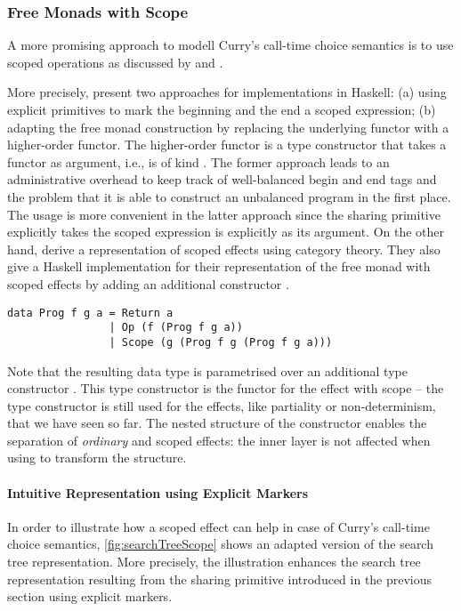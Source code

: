 \subsubsection{Free Monads with Scope}

A more promising approach to modell Curry's call-time choice semantics is to use scoped operations as discussed by \citet{wu2014effect} and \citet{pirog2018syntax}.

More precisely, \citeauthor{wu2014effect} present two approaches for implementations in Haskell: (a) using explicit primitives to mark the beginning and the end a scoped expression; (b) adapting the free monad construction by replacing the underlying functor with a higher-order functor.
The higher-order functor is a type constructor that takes a functor as argument, i.e., is of kind \hinl{(* -> *) -> * -> *}.
The former approach leads to an administrative overhead to keep track of well-balanced begin and end tags and the problem that it is able to construct an unbalanced program in the first place.
The usage is more convenient in the latter approach since the sharing primitive explicitly takes the scoped expression is explicitly as its argument.
On the other hand, \citeauthor{pirog2018syntax} derive a representation of scoped effects using category theory.
They also give a Haskell implementation for their representation of the free monad with scoped effects by adding an additional constructor .

\begin{verbatim}
data Prog f g a = Return a
                | Op (f (Prog f g a))
                | Scope (g (Prog f g (Prog f g a)))
\end{verbatim}

Note that the resulting data type  is parametrised over an additional type constructor .
This type constructor is the functor for the effect with scope -- the type constructor  is still used for the effects, like partiality or non-determinism, that we have seen so far.
The nested structure of the  constructor enables the separation of \emph{ordinary} and scoped effects: the inner  layer is not affected when using \hinl{(>>=)} to transform the structure.

\paragraph{Intuitive Representation using Explicit Markers}

In order to illustrate how a scoped effect can help in case of Curry's call-time choice semantics, \autoref{fig:searchTreeScope} shows an adapted version of the search tree representation.
More precisely, the illustration enhances the search tree representation resulting from the sharing primitive introduced in the previous section using explicit markers.


